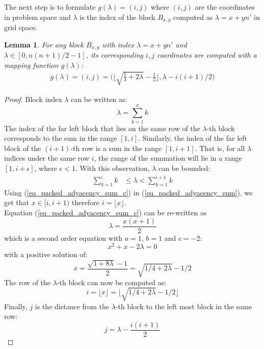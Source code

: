 \documentclass[conference]{IEEEtran}
\newtheorem*{thma}{Lemma}
\begin{document}
The next step is to formulate $g(\lambda) = (i,j)$ where $(i,j)$ are the coordinates in problem space and 
$\lambda$ is the index of the block $B_{x,y}$ computed as $\lambda = x + yn'$ in grid space. 
\begin{thma}
	For any block $B_{x,y}$ with index $\lambda = x + yn'$ and $\lambda \in [0, n(n+1)/2-1]$, 
	its corresponding $i,j$ coordinates are computed with a mapping function $g(\lambda)$:
	\begin{align}
	g(\lambda) = (i,j) = \Big(\Big\lfloor\sqrt{\frac{1}{4} + 2\lambda} - \frac{1}{2}\Big\rfloor, \lambda - i(i+1)/2\Big)
	\label{eq_theorem}
	\end{align}
\end{thma}
\begin{proof}[Proof]
	Block index $\lambda$ can be written as:
	\begin{equation}
	\lambda = \sum_{k=1}^{x}k
	\label{eq_packed_adyacency_sum_c}
	\end{equation}
	The index of the far left block that lies on the same row of the $\lambda$-th block corresponds to the sum in the range $[1,i]$. 
	Similarly, the index of the far left block of the $(i+1)$-th row is 
	a sum in the range $[1,i+1]$. That is, for all $\lambda$ indices under the same row $i$, 
	the range of the summation will lie in a range $[1,i+\epsilon]$, where $\epsilon < 1$. With this observation, $\lambda$ can be bounded:
	\begin{align}
	\sum_{k=1}^{i}k & \le \lambda < \sum_{k=1}^{i+1}k
\label{eq_packed_adyacency_sum}
	\end{align} 
	Using (\ref{eq_packed_adyacency_sum_c}) in (\ref{eq_packed_adyacency_sum}), we get that $x \in [i,i+1)$ therefore $i = \lfloor x\rfloor$.\\
	Equation (\ref{eq_packed_adyacency_sum_c}) can be re-written as
	\begin{equation}
	\lambda = \frac{x(x+1)}{2} 
	\label{eq_packed_adyacency_sum_c_2}
	\end{equation}
	which is a second order equation with $a=1$, $b=1$ and $c=-2$:
	\begin{equation}
	x^2 + x - 2\lambda = 0
	\label{eq_packed_adyacency_equation}
	\end{equation}
	with a positive solution of:
	\begin{equation}
	x = \frac{\sqrt{1 + 8\lambda} - 1}{2} = \sqrt{1/4 + 2\lambda} - 1/2
	\label{eq_packed_adyacency_x}
	\end{equation}
	The row of the $\lambda$-th block can now be computed as:
	\begin{equation}
	i = \lfloor x \rfloor = \Big\lfloor \sqrt{1/4 + 2\lambda} - 1/2 \Big\rfloor
	\end{equation} 
	Finally, $j$ is the distance from the $\lambda$-th block to the left most block in the same row:
	\begin{equation}
	j = \lambda - \frac{i(i+1)}{2}
	\label{eq_packed_adyacency_j}
	\end{equation}
\end{proof}
\end{document}

